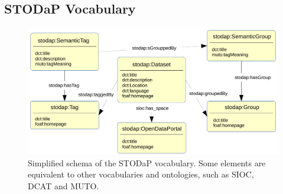 

\subsection{STODaP Vocabulary}
\label{sec:stodap_vocabulary}

\begin{figure}[b]
\begin{center}
\includegraphics[width=\columnwidth]{images/stodap_vocabulary.pdf}
\caption[Simplified schema of the STODaP vocabulary.]{Simplified schema of the STODaP vocabulary. Some elements are equivalent to other vocabularies and ontologies, such as SIOC, DCAT and MUTO.}
\label{fig:vocabulary}
\end{center}
\end{figure}

